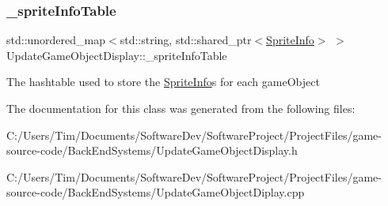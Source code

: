 \subsubsection{\texorpdfstring{\+\_\+sprite\+Info\+Table}{\_spriteInfoTable}}
{\footnotesize\ttfamily std\+::unordered\+\_\+map$<$std\+::string, std\+::shared\+\_\+ptr$<$\hyperlink{struct_sprite_info}{Sprite\+Info}$>$ $>$ Update\+Game\+Object\+Display\+::\+\_\+sprite\+Info\+Table\hspace{0.3cm}{\ttfamily [private]}}

The hashtable used to store the \hyperlink{struct_sprite_info}{Sprite\+Info}\textquotesingle{}s for each game\+Object 

The documentation for this class was generated from the following files\+:\begin{DoxyCompactItemize}
\item 
C\+:/\+Users/\+Tim/\+Documents/\+Software\+Dev/\+Software\+Project/\+Project\+Files/game-\/source-\/code/\+Back\+End\+Systems/Update\+Game\+Object\+Display.\+h\item 
C\+:/\+Users/\+Tim/\+Documents/\+Software\+Dev/\+Software\+Project/\+Project\+Files/game-\/source-\/code/\+Back\+End\+Systems/Update\+Game\+Object\+Diplay.\+cpp\end{DoxyCompactItemize}
